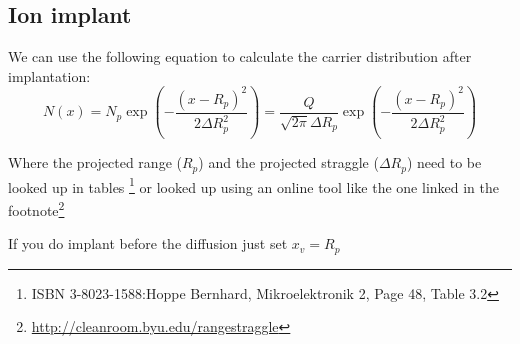 \subsection{Ion implant}
We can use the following equation to calculate the carrier distribution after implantation:
\begin{equation}
N(x)
=
N_p \exp\left(-\frac{(x-R_p)^2}{2\Delta R_p^2}\right)
=
\frac{Q}{\sqrt{2\pi}\Delta R_p}\exp\left(-\frac{(x-R_p)^2}{2\Delta R_p^2}\right)
\end{equation}

Where the projected range ($R_p$) and the projected straggle ($\Delta R_p$) need to be looked up in tables \footnote{ISBN 3-8023-1588:Hoppe Bernhard, Mikroelektronik 2, Page 48, Table 3.2} or looked up using an online tool like the one linked in the footnote\footnote{\url{http://cleanroom.byu.edu/rangestraggle}}

\begin{mdframed}[linewidth=2pt,linecolor=red]
If you do implant before the diffusion just set $x_v=R_p$
\end{mdframed}
